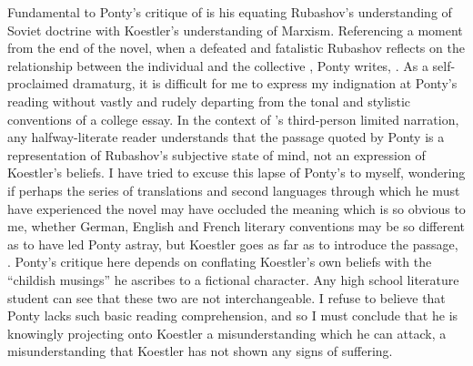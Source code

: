 Fundamental to Ponty's critique of \dark{} is his equating Rubashov's understanding of
Soviet doctrine with Koestler's understanding of Marxism. Referencing a moment from the
end of the novel, when a defeated and fatalistic Rubashov reflects on the relationship
between the individual and the collective \parencite[77]{koestler}, Ponty writes,
. As a self-proclaimed dramaturg, it is
difficult for me to express my indignation at Ponty's reading without vastly and rudely
departing from the tonal and stylistic conventions of a college essay. In the context of
\dark{}'s third-person limited narration, any halfway-literate reader understands that the
passage quoted by Ponty is a representation of Rubashov's subjective state of mind, not an
expression of Koestler's beliefs. I have tried to excuse this lapse of Ponty's to myself,
wondering if perhaps the series of translations and second languages through which he must
have experienced the novel may have occluded the meaning which is so obvious to me,
whether German, English and French literary conventions may be so different as to have led
Ponty astray, but Koestler goes as far as to introduce the passage,
. Ponty's critique here depends on conflating Koestler's own beliefs with the
\enquote{childish musings} he ascribes to a fictional character. Any high school
literature student can see that these two are not interchangeable. I refuse to believe
that Ponty lacks such basic reading comprehension, and so I must conclude that he is
knowingly projecting onto Koestler a misunderstanding which he can attack, a
misunderstanding that Koestler has not shown any signs of suffering.



